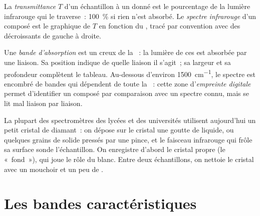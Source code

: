 \begin{definition}\label{def:g11:infrared:spectrum}
La \emph{transmittance} $T$ d'un échantillon à un
 donné est le pourcentage de la lumière infrarouge qui le
traverse~: \qty{100}{\percent} si rien n'est absorbé. Le \emph{spectre
infrarouge} d'un composé est le graphique de
$T$ en fonction du , tracé par convention avec des  décroissants de gauche à droite.
\end{definition}

\begin{definition}\label{def:g11:infrared:band}
Une \emph{bande d'absorption} est un creux de
la ~: la lumière de ces  est absorbée par une
liaison. Sa position indique de quelle liaison il s'agit~; sa largeur et
sa profondeur complètent le tableau. Au-dessous d'environ
\qty{1500}{cm^{-1}}, le spectre est encombré de bandes qui dépendent de
toute la ~: cette zone d'\emph{empreinte
digitale} permet d'identifier un composé par
comparaison avec un spectre connu, mais se lit mal liaison par liaison.
\end{definition}

\begin{inthelab}
La plupart des spectromètres des lycées et des universités utilisent
aujourd'hui un petit cristal de diamant~: on dépose sur le cristal une
goutte de liquide, ou quelques grains de solide pressés par une pince,
et le faisceau infrarouge qui frôle sa surface sonde l'échantillon. On
enregistre d'abord le cristal propre (le «~fond~»), qui joue le rôle du
blanc. Entre deux échantillons, on nettoie le cristal avec un mouchoir
et un peu de .
\end{inthelab}

\section{Les bandes caractéristiques}

